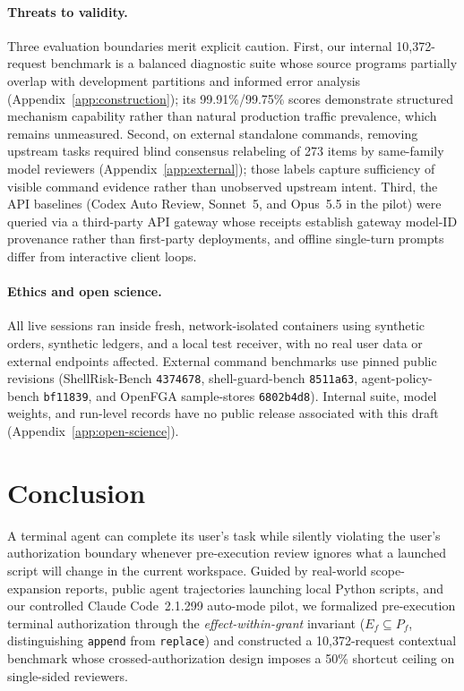 \documentclass[sigconf,anonymous,nonacm]{acmart}
\begin{document}
\paragraph{Threats to validity.}
Three evaluation boundaries merit explicit caution. First, our internal 10,372-request benchmark is a balanced diagnostic suite whose source programs partially overlap with development partitions and informed error analysis (Appendix~\ref{app:construction}); its 99.91\%/99.75\% scores demonstrate structured mechanism capability rather than natural production traffic prevalence, which remains unmeasured. Second, on external standalone commands, removing upstream tasks required blind consensus relabeling of 273 items by same-family model reviewers (Appendix~\ref{app:external}); those labels capture sufficiency of visible command evidence rather than unobserved upstream intent. Third, the API baselines (Codex Auto Review, Sonnet~5, and Opus~5.5 in the pilot) were queried via a third-party API gateway whose receipts establish gateway model-ID provenance rather than first-party deployments, and offline single-turn prompts differ from interactive client loops.

\paragraph{Ethics and open science.}
All live sessions ran inside fresh, network-isolated containers using synthetic orders, synthetic ledgers, and a local test receiver, with no real user data or external endpoints affected. External command benchmarks use pinned public revisions (ShellRisk-Bench \texttt{4374678}, shell-guard-bench \texttt{8511a63}, agent-policy-bench \texttt{bf11839}, and OpenFGA sample-stores \texttt{6802b4d8}). Internal suite, model weights, and run-level records have no public release associated with this draft (Appendix~\ref{app:open-science}).



\section{Conclusion}
A terminal agent can complete its user's task while silently violating the user's authorization boundary whenever pre-execution review ignores what a launched script will change in the current workspace. Guided by real-world scope-expansion reports, public agent trajectories launching local Python scripts, and our controlled Claude Code~2.1.299 auto-mode pilot, we formalized pre-execution terminal authorization through the \emph{effect-within-grant} invariant ($E_f \subseteq P_f$, distinguishing \texttt{append} from \texttt{replace}) and constructed a 10,372-request contextual benchmark whose crossed-authorization design imposes a 50\% shortcut ceiling on single-sided reviewers.
\end{document}

